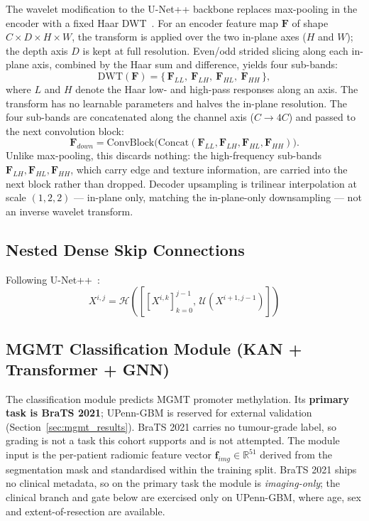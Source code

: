 \documentclass[conference]{IEEEtran}
\begin{document}
The wavelet modification to the U-Net++ backbone replaces max-pooling in the encoder with a fixed Haar DWT~\cite{mallat1989theory,daubechies1992ten}. For an encoder feature map $\mathbf{F}$ of shape $C\times D\times H\times W$, the transform is applied over the two in-plane axes ($H$ and $W$); the depth axis $D$ is kept at full resolution. Even/odd strided slicing along each in-plane axis, combined by the Haar sum and difference, yields four sub-bands:
\begin{equation}
\text{DWT}(\mathbf{F}) = \{\,\mathbf{F}_{LL},\ \mathbf{F}_{LH},\ \mathbf{F}_{HL},\ \mathbf{F}_{HH}\,\},
\end{equation}
where $L$ and $H$ denote the Haar low- and high-pass responses along an axis. The transform has no learnable parameters and halves the in-plane resolution. The four sub-bands are concatenated along the channel axis ($C\rightarrow 4C$) and passed to the next convolution block:
\begin{equation}
\mathbf{F}_{down} = \text{ConvBlock}\big(\text{Concat}(\mathbf{F}_{LL}, \mathbf{F}_{LH}, \mathbf{F}_{HL}, \mathbf{F}_{HH})\big).
\end{equation}
Unlike max-pooling, this discards nothing: the high-frequency sub-bands $\mathbf{F}_{LH}, \mathbf{F}_{HL}, \mathbf{F}_{HH}$, which carry edge and texture information, are carried into the next block rather than dropped. Decoder upsampling is trilinear interpolation at scale $(1,2,2)$ --- in-plane only, matching the in-plane-only downsampling --- not an inverse wavelet transform.

\subsection{Nested Dense Skip Connections}

Following U-Net++~\cite{zhou2018unetpp}:
\begin{equation}
X^{i,j} = \mathcal{H}\!\left(\left[[X^{i,k}]_{k=0}^{j-1},\, \mathcal{U}(X^{i+1,j-1})\right]\right)
\end{equation}

\subsection{MGMT Classification Module (KAN + Transformer + GNN)}
\label{sec:mgmt_module}

The classification module predicts MGMT promoter methylation. Its \textbf{primary task is BraTS 2021}; UPenn-GBM is reserved for external validation (Section~\ref{sec:mgmt_results}). BraTS 2021 carries no tumour-grade label, so grading is not a task this cohort supports and is not attempted. The module input is the per-patient radiomic feature vector $\mathbf{f}_{img}\in\mathbb{R}^{51}$ derived from the segmentation mask and standardised within the training split. BraTS 2021 ships no clinical metadata, so on the primary task the module is \emph{imaging-only}; the clinical branch and gate below are exercised only on UPenn-GBM, where age, sex and extent-of-resection are available.
\end{document}
